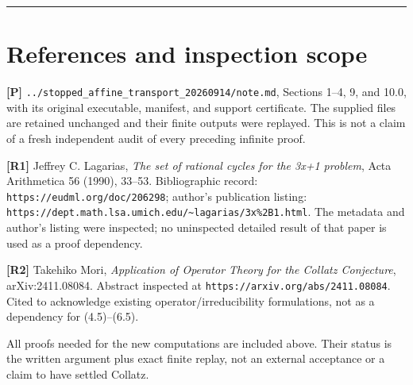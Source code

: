 \begin{center}\rule{0.5\linewidth}{0.5pt}\end{center}

\section{References and inspection scope}

\textbf{{[}P{]}}
\nolinkurl{../stopped_affine_transport_20260914/note.md}, Sections 1--4,
9, and 10.0, with its original executable, manifest, and support
certificate. The supplied files are retained unchanged and their finite
outputs were replayed. This is not a claim of a fresh independent audit
of every preceding infinite proof.

\textbf{{[}R1{]}} Jeffrey C. Lagarias, \emph{The set of rational cycles
for the 3x+1 problem}, Acta Arithmetica 56 (1990), 33--53. Bibliographic
record: \nolinkurl{https://eudml.org/doc/206298}; author's publication
listing:
\nolinkurl{https://dept.math.lsa.umich.edu/~lagarias/3x%2B1.html}. The
metadata and author's listing were inspected; no uninspected detailed
result of that paper is used as a proof dependency.

\textbf{{[}R2{]}} Takehiko Mori, \emph{Application of Operator Theory
for the Collatz Conjecture}, arXiv:2411.08084. Abstract inspected at
\nolinkurl{https://arxiv.org/abs/2411.08084}. Cited to acknowledge
existing operator/irreducibility formulations, not as a dependency for
(4.5)--(6.5).

All proofs needed for the new computations are included above. Their
status is the written argument plus exact finite replay, not an external
acceptance or a claim to have settled Collatz.
